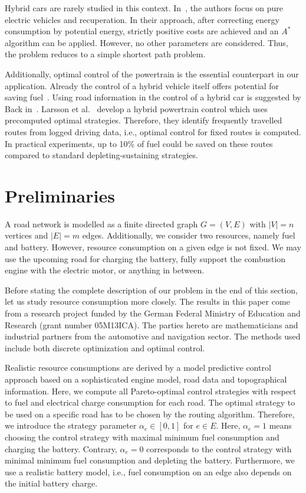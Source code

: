 \documentclass[a4paper]{scrartcl}
\begin{document}
Hybrid cars are rarely studied in this context. In~\cite{elektro:modellierung}, the authors focus on pure electric vehicles and recuperation. In their approach, after correcting energy consumption by potential energy, strictly positive costs are achieved and an $A^*$ algorithm can be applied. However, no other parameters are considered. Thus, the problem reduces to a simple shortest path problem. 

Additionally, optimal control of the powertrain is the essential counterpart in our application. Already the control of a hybrid vehicle itself offers potential for saving fuel~\cite{hybrid:Zhang:motorsteuerung}. Using road information in the control of a hybrid car is suggested by Back in~\cite{back:motorsteuerung}. Larsson et al.~\cite{hybrid:Larsson:route+steuerung,hybrid:Larsson+:route+steuerung} develop a hybrid powertrain control which uses precomputed optimal strategies. Therefore, they identify frequently travelled routes from logged driving data, i.e., optimal control for fixed routes is computed. In practical experiments, up to 10\% of fuel could be saved on these routes compared to standard depleting-sustaining strategies.

\section{Preliminaries}\label{sec:preliminaries}

A road network is modelled as a finite directed graph $G=(V,E)$ with $|V|=n$ vertices and $|E|=m$ edges. Additionally, we consider two resources, namely fuel and battery. However, resource consumption on a given edge is not fixed. We may use the upcoming road for charging the battery, fully support the combustion engine with the electric motor, or anything in between.

Before stating the complete description of our problem in the end of this section, let us study resource consumption more closely. The results in this paper come from a research project funded by the German Federal Ministry of Education and Research (grant number 05M13ICA). The parties hereto are mathematicians and industrial partners from the automotive and navigation sector. The methods used include both discrete optimization and optimal control.

Realistic resource consumptions are derived by a model predictive control approach based on a sophisticated engine model, road data and topographical information. Here, we compute all Pareto-optimal control strategies with respect to fuel and electrical charge consumption for each road. The optimal strategy to be used on a specific road has to be chosen by the routing algorithm. Therefore, we introduce the strategy parameter $\alpha_e\in [0,1]$ for $e\in E$. Here, $\alpha_e=1$ means choosing the control strategy with maximal minimum fuel consumption and charging the battery. Contrary, $\alpha_e=0$ corresponds to the control strategy with minimal minimum fuel consumption and depleting the battery. Furthermore, we use a realistic battery model, i.e., fuel consumption on an edge also depends on the initial battery charge.
\end{document}
